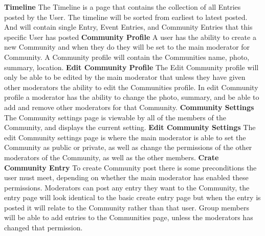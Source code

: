 \documentclass[letterpaper, 10, draftclsnofoot, onecolumn]{IEEEtran}
\begin{document}
\newline
\newline
\textbf{Timeline}
\newline
\indent The Timeline is a page that contains the collection of all Entries posted by the User. The timeline will be sorted from earliest to latest posted. And will contain single Entry, Event Entries, and Community Entries that this specific User has posted
\newline
\newline
\textbf{Community Profile}
\newline
\indent A user has the ability to create a new Community and when they do they will be set to the main moderator for Community. A Community profile will contain the Communities name, photo, summary, location.
\newline
\newline
\textbf{Edit Community Profile}
\newline
\indent The Edit Community profile will only be able to be edited by the main moderator that unless they have given other moderators the ability to edit the Communities profile. In edit Community profile a moderator has the ability to change the photo, summary, and be able to add and remove other moderators for that Community.  
\newline
\newline
\textbf{Community Settings}
\newline
\indent The Community settings page is viewable by all of the members of the Community, and displays the current setting. 
\newline
\newline
\textbf{Edit Community Settings}
\newline
\indent The edit Community settings page is where the main moderator is able to set the Community as public or private, as well as change the permissions of the other moderators of the Community, as well as the other members.
\newline
\newline
\textbf{Crate Community Entry}
\newline
\indent To create Community post there is some preconditions the user must meet, depending on whether the main moderator has enabled these permissions. Moderators can post any entry they want to the Community, the entry page will look identical to the basic create entry page but when the entry is posted it will relate to the Community rather than that user. Group members will be able to add entries to the Communities page, unless the moderators has changed that permission. 
\end{document}
